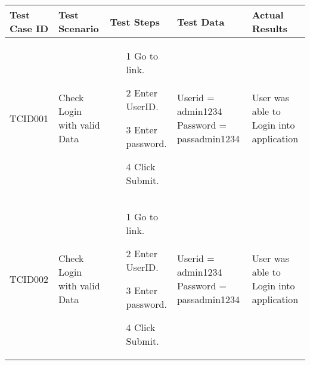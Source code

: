\begin{center} 
	\textbf{}
\end{center}
	
	\begin{center}
	\begin{singlespace}
		\begin{tabular}{ | C{1.5cm} | C{2.5cm} |C{3cm} |C{3cm} |C{3cm} |}  
			\hline
			\textbf{Test Case ID} & \textbf{Test Scenario} & \textbf{Test Steps} & \textbf{Test Data} & \textbf{Actual Results}\\
			\hline 
			TCID001 & Check Login with valid Data & 
			\begin{enumerate}
				\item [1] Go to link. 
				\item [2] Enter UserID.
				\item [3] Enter password.
				\item [4] Click Submit. 
			\end{enumerate} & Userid = admin1234 Password = passadmin1234 & User was able to Login into application\\
			\hline	
			TCID002 & Check Login with valid Data & 
			\begin{enumerate}
				\item [1] Go to link. 
				\item [2] Enter UserID.
				\item [3] Enter password.
				\item [4] Click Submit. 
			\end{enumerate} & Userid = admin1234 Password = passadmin1234 & User was able to Login into application\\
			\hline	
		\end{tabular}
	\end{singlespace}
	\end{center}


